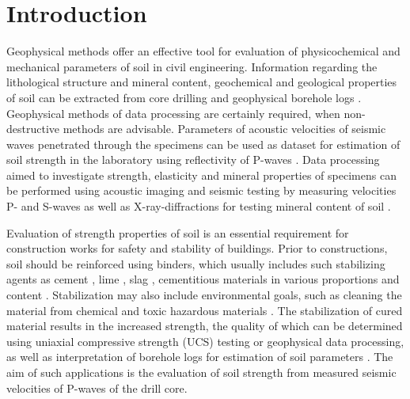\documentclass[USenglish,twocolumn]{article}
\begin{document}



  
\maketitle

\section{Introduction}

Geophysical methods offer an effective tool for evaluation of physicochemical and mechanical parameters of soil in civil engineering. Information regarding the lithological structure and mineral content, geochemical and geological properties of soil can be extracted from core drilling and geophysical borehole logs \cite{MAUCEC2009194,JING2021101534}. Geophysical methods of data processing are certainly required, when non-destructive methods are advisable. Parameters of acoustic velocities of seismic waves penetrated through the specimens can be used as dataset for estimation of soil strength in the laboratory using reflectivity of P-waves \cite{Lindh202102,Lindh202210}. Data processing aimed to investigate strength, elasticity and mineral properties of specimens can be performed using acoustic imaging and seismic testing by measuring velocities P- and S-waves \cite{Tang2009,Tronicke,Hadden} as well as X-ray-diffractions for testing mineral content of soil \cite{Wang}. 

Evaluation of strength properties of soil is an essential requirement for construction works for safety and stability of buildings. Prior to constructions, soil should be reinforced using binders, which usually includes such stabilizing agents as cement \cite{Lindh2004,HORPIBULSUK20102011}, lime \cite{OKYAY201034,JAUBERTHIE2010395}, slag \cite{Lindh2021a}, cementitious materials \cite{YOON20102322} in various proportions and content \cite{Lindh2001}. Stabilization may also include environmental goals, such as cleaning the material from chemical \cite{CONTESSI2021141826,Lemenkova202222} and toxic hazardous materials  \cite{Lindh202201}. The stabilization of cured material results in the increased strength, the quality of which can be determined using uniaxial compressive strength (UCS) testing or geophysical data processing, as well as interpretation of borehole logs for estimation of soil parameters \cite{LIU2022107048,Rydenetal2016,COMINA2021106278}. The aim of such applications is the evaluation of soil strength from measured seismic velocities of P-waves of the drill core. 
\end{document}
